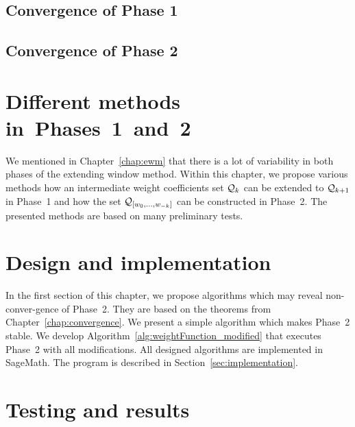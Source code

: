 	\section{Convergence of Phase 1}
	

	\section{Convergence of Phase 2}
	
	

	


\chapter{Different methods in~Phases~1~and~2}
	\label{chap:diffChoices}
	We mentioned in Chapter~\ref{chap:ewm} that there is a lot of variability in both phases of the extending window method. Within this chapter, we propose various methods how an intermediate weight coefficients set $\mathcal{Q}_k$ can be extended to $\mathcal{Q}_{k+1}$ in Phase~1 and how the set $\mathcal{Q}_{[w_{0}, \dots, w_{-k}]}$ can be constructed in Phase~2. The presented methods are based on many preliminary tests.

	

	

	
	


\chapter{Design and implementation}

In the first section of this chapter, we propose algorithms which may reveal non-conver-gence of Phase~2. They are based on the theorems from Chapter~\ref{chap:convergence}. We present a simple algorithm which makes Phase~2 stable. We develop Algorithm~\ref{alg:weightFunction_modified} that executes  Phase~2 with all modifications. All designed algorithms are implemented in SageMath. The program is described in Section~\ref{sec:implementation}.
\label{chap:design}
	
	

\chapter{Testing and results}
\label{chap:testing}
	


\cleardoublepage{}
{}
